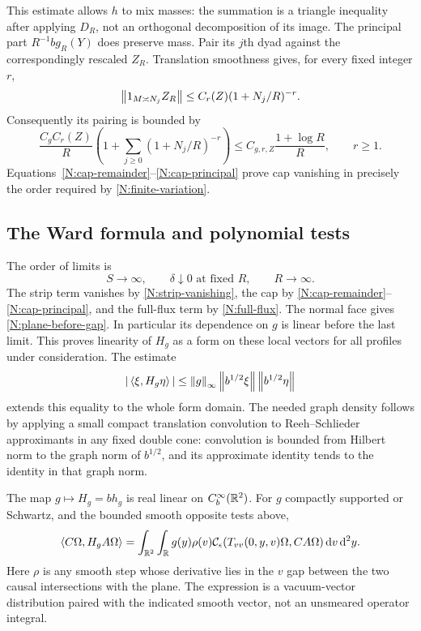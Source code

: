 This estimate allows $h$ to mix masses: the summation is a triangle
inequality after applying $D_R$, not an orthogonal decomposition
of its image.  The principal part $R^{-1}bg_R(Y)$ does preserve
mass.  Pair its $j$th dyad against the correspondingly rescaled
$Z_R$.  Translation smoothness gives, for every fixed integer $r$,
\[
 \left\lVert1_{M\asymp N_j}Z_R\right\rVert
 \leq C_r(Z)(1+N_j/R)^{-r}.
\]
Consequently its pairing is bounded by
\begin{equation}\label{N:cap-principal}
 \frac{C_gC_r(Z)}R
 \left(1+\sum_{j\geq0}(1+N_j/R)^{-r}\right)
 \leq C_{g,r,Z}\frac{1+\log R}{R},\qquad r\geq1.
\end{equation}
Equations~\eqref{N:cap-remainder}--\eqref{N:cap-principal} prove
cap vanishing in precisely the order required by
\eqref{N:finite-variation}.

\subsection{The Ward formula and polynomial tests}

The order of limits is
\begin{equation}\label{N:limit-order}
 S\longrightarrow\infty,\qquad
 \delta\downarrow0\text{ at fixed }R,\qquad
 R\longrightarrow\infty.
\end{equation}
The strip term vanishes by \eqref{N:strip-vanishing}, the cap by
\eqref{N:cap-remainder}--\eqref{N:cap-principal}, and the full-flux
term by \eqref{N:full-flux}.  The normal face gives
\eqref{N:plane-before-gap}.  In particular its dependence on $g$
is linear before the last limit.  This proves linearity of $H_g$
as a form on these local vectors for all profiles under consideration.
The estimate
\[
 |\left\langle\xi,H_g\eta\right\rangle|
 \leq\left\lVert g\right\rVert_\infty\left\lVert b^{1/2}\xi\right\rVert\left\lVert b^{1/2}\eta\right\rVert
\]
extends this equality to the whole form domain.  The needed graph
density follows by applying a small compact translation convolution
to Reeh--Schlieder approximants in any fixed double cone: convolution
is bounded from Hilbert norm to the graph norm of $b^{1/2}$, and its
approximate identity tends to the identity in that graph norm.

\begin{proposition}\label{N:Ward-proposition}
The map $g\mapsto H_g=bh_g$ is real linear on $C_b^\infty(\mathbb R^2)$.
For $g$ compactly supported or Schwartz, and the bounded smooth
opposite tests above,
\begin{equation}\label{N:bounded-Ward}
 \left\langle C\Omega,H_gA\Omega\right\rangle
 =\int_{\mathbb R^2}\int_\mathbb R g(y)\rho(v)
    \mathcal C_\epsilon(T_{vv}(0,y,v)\Omega,CA\Omega)
        \,\mathrm d v\,\mathrm d^2y.
\end{equation}
Here $\rho$ is any smooth step whose derivative lies in the $v$ gap
between the two causal intersections with the plane.  The expression
is a vacuum-vector distribution paired with the indicated smooth
vector, not an unsmeared operator integral.
\end{proposition}

